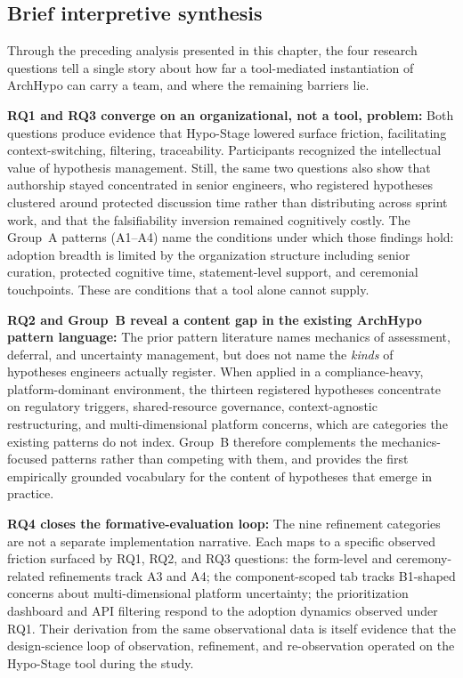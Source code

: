 \subsection{Brief interpretive synthesis}

Through the preceding analysis presented in this chapter, the four research questions tell a single story about how far a
tool-mediated instantiation of ArchHypo can carry a team, and where the remaining barriers lie.

\textbf{RQ1 and RQ3 converge on an organizational, not a tool, problem:}
Both questions produce evidence that Hypo-Stage lowered surface friction, 
facilitating context-switching, filtering, traceability. Participants
recognized the intellectual value of hypothesis management. Still, the same two
questions also show that authorship stayed concentrated in senior engineers,
who registered hypotheses clustered around protected discussion time rather than
distributing across sprint work, and that the falsifiability inversion
remained cognitively costly. The Group~A patterns (A1--A4) name the
conditions under which those findings hold: adoption breadth is limited by the
organization structure including senior curation, protected cognitive time,
statement-level support, and ceremonial touchpoints. These are conditions that a tool alone
cannot supply.

\textbf{RQ2 and Group~B reveal a content gap in the existing ArchHypo
pattern language:} The prior pattern literature
\citep{silva2024patterns, silva2023initialpatterns} names mechanics of
assessment, deferral, and uncertainty management, but does not name the
\emph{kinds} of hypotheses engineers actually register. When applied in a
compliance-heavy, platform-dominant environment, the thirteen registered
hypotheses concentrate on regulatory triggers, shared-resource governance,
context-agnostic restructuring, and multi-dimensional platform concerns, which are categories the
existing patterns do not index. Group~B therefore complements the
mechanics-focused patterns rather than competing with them, and provides
the first empirically grounded vocabulary for the content of hypotheses
that emerge in practice.

\textbf{RQ4 closes the formative-evaluation loop:} The nine refinement
categories are not a separate implementation narrative. Each maps to a
specific observed friction surfaced by RQ1, RQ2, and RQ3 questions: the form-level and
ceremony-related refinements track A3 and A4; the component-scoped tab
tracks B1-shaped concerns about multi-dimensional platform uncertainty; the
prioritization dashboard and API filtering respond to the adoption
dynamics observed under RQ1. Their derivation from the same observational
data is itself evidence that the design-science loop of observation,
refinement, and re-observation operated on the Hypo-Stage tool during the study.

